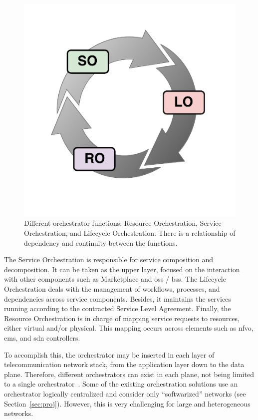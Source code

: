 \begin{figure}[t!]
  \centering
  \includegraphics[scale=.35]{Figures/04_NSO/fun_orch}
    \caption{Different orchestrator functions: Resource Orchestration, Service Orchestration, and Lifecycle Orchestration. There is a relationship of dependency and continuity between the functions.}
    \label{funOrch}
\end{figure}

The Service Orchestration is responsible for service composition and decomposition. It can be taken as the upper layer, focused on the interaction with other components such as Marketplace and \gls{oss} / \gls{bss}. The Lifecycle Orchestration deals with the management of workflows, processes, and dependencies across service components. Besides, it maintains the services running according to the contracted Service Level Agreement. Finally, the Resource Orchestration is in charge of mapping service requests to resources, either virtual and/or physical. This mapping occurs across elements such as \gls{nfvo}, \gls{ems}, and \gls{sdn} controllers.


To accomplish this, the orchestrator may be inserted in each layer of telecommunication network stack, from the application layer down to the data plane. Therefore, different orchestrators can exist in each plane, not being limited to a single orchestrator~\cite{Alvizu2016AdvanceEra}. Some of the existing orchestration solutions use an orchestrator logically centralized and consider only ``softwarized'' networks (see Section~\ref{sec:proj}). However, this is very challenging for large and heterogeneous networks. 

